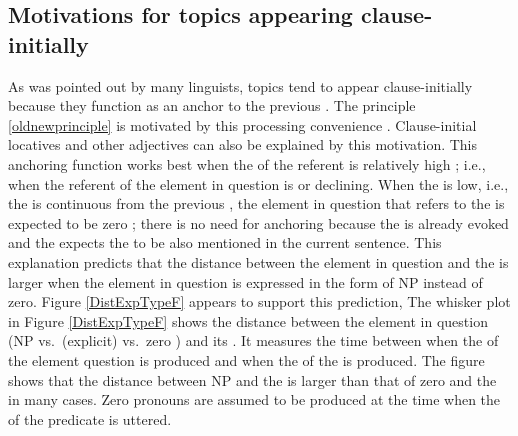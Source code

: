 \subsection{Motivations for topics appearing clause-initially}\label{TopicAppearClause-Initially}

As was pointed out by many linguists,
topics tend to appear clause-initially
because they function as an anchor to the previous .
The principle \ref{oldnewprinciple} is motivated by this processing convenience \cite[e.g.,][]{keenan77}.
Clause-initial locatives and other adjectives can also be explained by this motivation.
This anchoring function works best when the  of the referent is relatively high \cite{givon83};
i.e.,
when the referent of the element in question is  or declining.
When the  is low, i.e., the  is continuous from the previous ,
the element in question that refers to the  is expected to be zero \cite{givon83,gundeletal93,ariel90};
there is no need for anchoring because the  is already evoked and the  expects the  to be also mentioned in the current sentence.
This explanation predicts that the distance between the element in question and the  is larger when the element in question is expressed in the form of NP instead of zero.
Figure \ref{DistExpTypeF} appears to support this prediction,
The whisker plot in Figure \ref{DistExpTypeF} shows the distance between the element in question (NP vs.\ (explicit)  vs.\ zero ) and its .
It measures the time between when the  of the element question is produced and when the  of the  is produced.
The figure shows that the distance between NP and the  is larger than that of zero and the  in many cases.
Zero pronouns are assumed to be produced at the time
when the  of the predicate is uttered.

